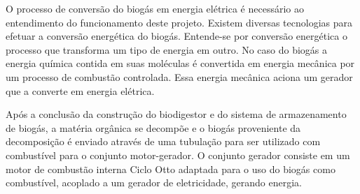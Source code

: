O processo de conversão do biogás em energia elétrica é necessário ao entendimento do funcionamento deste projeto. Existem diversas tecnologias para efetuar a conversão energética do biogás. Entende-se por conversão energética o processo que transforma um tipo de energia em outro. No caso do biogás a energia química contida em suas moléculas é convertida em energia mecânica por um processo de combustão controlada. Essa energia mecânica aciona um gerador que a converte em energia elétrica.
\par Após a conclusão da construção do biodigestor e do sistema de armazenamento de biogás, a matéria orgânica se decompõe e o biogás proveniente da decomposição é enviado através de uma tubulação para ser utilizado com combustível para o conjunto motor-gerador. O conjunto gerador consiste em um motor de combustão interna Ciclo Otto adaptada para o uso do biogás como combustível, acoplado a um gerador de eletricidade, gerando energia.
